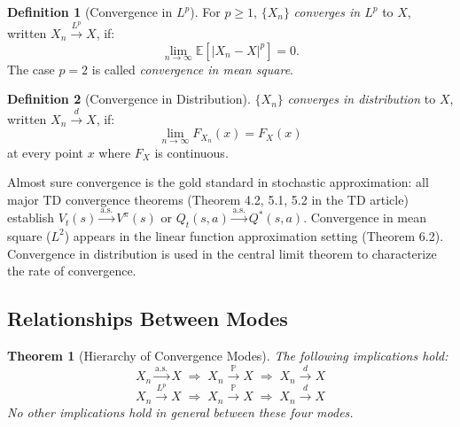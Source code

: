 \documentclass[11pt,a4paper]{article}
\theoremstyle{definition}
\newtheorem{definition}{Definition}[section]
\theoremstyle{plain}
\newtheorem{theorem}{Theorem}[section]
\theoremstyle{remark}
\newcommand{\E}{\mathbb{E}}
\newcommand{\Prob}{\mathbb{P}}
\newcommand{\cas}{\xrightarrow{\text{a.s.}}}
\newcommand{\cprob}{\xrightarrow{\Prob}}
\newcommand{\clp}[1]{\xrightarrow{L^{#1}}}
\newcommand{\cdist}{\xrightarrow{d}}
\begin{document}
\begin{definition}[Convergence in $L^p$]
\label{def:lp_conv}
For $p \geq 1$, $\{X_n\}$ \emph{converges in $L^p$} to $X$, written $X_n \clp{p} X$, if:
\begin{equation}
    \lim_{n \to \infty} \E\!\left[|X_n - X|^p\right] = 0.
    \label{eq:lp_conv}
\end{equation}
The case $p = 2$ is called \emph{convergence in mean square}.
\end{definition}

\begin{definition}[Convergence in Distribution]
\label{def:dist_conv}
$\{X_n\}$ \emph{converges in distribution} to $X$, written $X_n \cdist X$, if:
\begin{equation}
    \lim_{n \to \infty} F_{X_n}(x) = F_X(x)
    \label{eq:dist_conv}
\end{equation}
at every point $x$ where $F_X$ is continuous.
\end{definition}

\begin{rlconnection}[Connection to RL]
Almost sure convergence is the gold standard in stochastic approximation: all major TD convergence theorems (Theorem 4.2, 5.1, 5.2 in the TD article) establish $V_t(s) \cas V^\pi(s)$ or $Q_t(s,a) \cas Q^*(s,a)$. Convergence in mean square ($L^2$) appears in the linear function approximation setting (Theorem 6.2). Convergence in distribution is used in the central limit theorem to characterize the rate of convergence.
\end{rlconnection}

\subsection{Relationships Between Modes}
\label{subsec:conv_relations}

\begin{keyresult}
\begin{theorem}[Hierarchy of Convergence Modes]
\label{thm:conv_hierarchy}
The following implications hold:
\begin{equation}
    X_n \cas X \;\Longrightarrow\; X_n \cprob X \;\Longrightarrow\; X_n \cdist X
    \label{eq:hierarchy_1}
\end{equation}
\begin{equation}
    X_n \clp{p} X \;\Longrightarrow\; X_n \cprob X \;\Longrightarrow\; X_n \cdist X
    \label{eq:hierarchy_2}
\end{equation}
No other implications hold in general between these four modes.
\end{theorem}
\end{keyresult}
\end{document}
